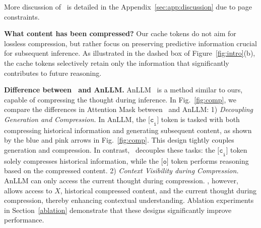 More discussion of \ours~is detailed in the Appendix~\ref{sec:app:discussion} due to page constraints.

\textbf{What content has been compressed?}
Our cache tokens do not aim for lossless compression, but rather focus on preserving predictive information crucial for subsequent inference. 
As illustrated in the dashed box of Figure~\ref{fig:intro}(b), the cache tokens selectively retain only the information that significantly contributes to future reasoning.



\textbf{Difference between \ours~and AnLLM.}
AnLLM~\citep{acl24_anllm} is a method similar to ours, capable of compressing the thought during inference.
In Fig.~\ref{fig:comp}, we compare the differences in Attention Mask between \ours~and AnLLM:
1) \textit{Decoupling Generation and Compression.}
In AnLLM, the $\texttt{[c}_\texttt{i}\texttt{]}$ token is tasked with both compressing historical information and generating subsequent content, as shown by the blue and pink arrows in Fig.~\ref{fig:comp}. 
This design tightly couples generation and compression. 
In contrast, \ours~decouples these tasks: the $\texttt{[c}_\texttt{i}\texttt{]}$ token solely compresses historical information, while the $\texttt{[o]}$ token performs reasoning based on the compressed content.
2) \textit{Context Visibility during Compression.}
AnLLM can only access the current thought during compression.
\ours, however, allows access to $X$, historical compressed content, and the current thought during compression, thereby enhancing contextual understanding.
Ablation experiments in Section~\ref{ablation} demonstrate that these designs significantly improve performance.


